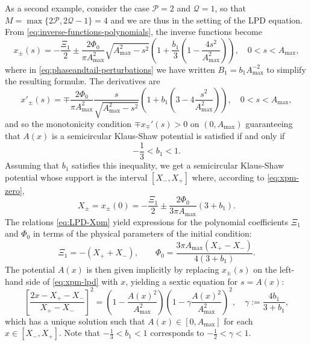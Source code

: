\documentclass[12pt]{amsart}
\numberwithin{equation}{section}
\newcommand{\phaseint}{\Phi}
\newcommand{\tailint}{\Xi}
\begin{document}
As a second example, consider the case $\mathcal{P}=2$ and $\mathcal{Q}=1$, so that $M=\max\{2\mathcal{P},2\mathcal{Q}-1\}=4$ and we are thus in the setting of the LPD equation. From \eqref{eq:inverse-functions-polynomials}, the inverse functions become 
\begin{equation}
	x_\pm(s) = -\frac{\tailint_1}{2}  \pm \frac{2\phaseint_0}{\pi A_\mathrm{max}^2} \sqrt{A_\mathrm{max}^2-s^2} \left(1 + \frac{b_1}{3}\left(1 -  \frac{4s^2}{A_\mathrm{max}^2} \right) \right) , \quad 0<s<A_\mathrm{max}, 
\label{eq:xpm-lpd}
\end{equation}
where in \eqref{eq:phaseandtail-perturbations} we have written $B_1 = b_1 A_{\mathrm{max}}^{-2}$ to simplify the resulting formul\ae. The derivatives are  
\begin{equation}
	x'_\pm(s) = \mp \frac{2\phaseint_0}{\pi A_\mathrm{max}^2} \frac{s}{ \sqrt{A_\mathrm{max}^2-s^2}} \left( 1 + b_1\left( 3  - 4 \frac{s^2}{A_\mathrm{max}^2} \right) \right), \quad 0<s<A_\mathrm{max},
\end{equation}
and so the monotonicity condition $\mp x_\mp'(s)>0$ on $(0, A_\mathrm{max})$ guaranteeing that $A(x)$ is a semicircular Klaus-Shaw potential is satisfied if and only if 
\begin{equation}
	-\frac{1}{3} < b_1 <  1.
\end{equation}
Assuming that $b_1$ satisfies this inequality, we get a semicircular Klaus-Shaw potential whose support is the interval $[X_-, X_+]$ where, according to \eqref{eq:xpm-zero},
\begin{equation}
	X_\pm = x_\pm(0) = -\frac{\tailint_1}{2} \pm \frac{2\phaseint_0}{3\pi A_\mathrm{max}} (3+b_1).
	\label{eq:LPD-Xpm}
\end{equation}
The relations \eqref{eq:LPD-Xpm} yield expressions for the polynomial coefficients $\tailint_1$ and $\Phi_0$ in terms of the physical parameters of the initial condition:
\begin{equation}
	\tailint_1 = - ( X_+ + X_-), \qquad \Phi_0 = \frac{3 \pi A_\mathrm{max} (X_+-X_-)}{4(3+b_1)}.
\end{equation}
The potential $A(x)$ is then given implicitly by replacing $x_\pm(s)$ on the left-hand side of \eqref{eq:xpm-lpd}
with $x$, yielding a sextic equation for $s=A(x)$:
\begin{equation}
	\left[ \frac{2x - X_+ -X_- }{X_+ - X_-} \right]^2 = 
	\left( 1 - \frac{ A(x)^2}{A^2_\mathrm{max}} \right)\left( 1 - \gamma \frac{ A(x)^2}{A^2_\mathrm{max}} \right)^2, \quad
	\gamma := \frac{4b_1}{3+b_1},
\label{eq:lpd-IC-implicit}
\end{equation}
which has a unique solution such that $A(x) \in [0,A_\mathrm{max}]$ for each $x \in [X_-, X_+]$.  Note that $-\frac{1}{3}<b_1<1$ corresponds to $-\frac{1}{2}<\gamma<1$.
\end{document}

